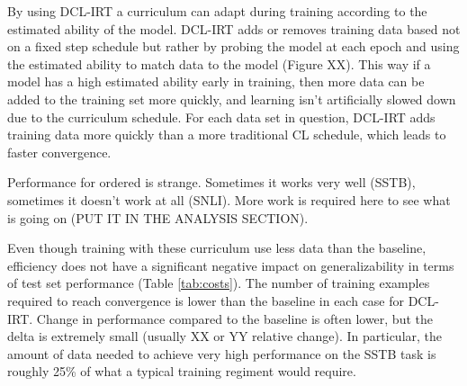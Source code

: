 \documentclass[letterpaper]{article} %
\begin{document}
By using DCL-IRT a curriculum can adapt during training according to the estimated ability of the model.
DCL-IRT adds or removes training data based not on a fixed step schedule but rather by probing the model at each epoch and using the estimated ability to match data to the model (Figure XX).
This way if a model has a high estimated ability early in training, then more data can be added to the training set more quickly, and learning isn't artificially slowed down due to the curriculum schedule.
For each data set in question, DCL-IRT adds training data more quickly than a more traditional CL schedule, which leads to faster convergence.

Performance for ordered is strange.
Sometimes it works very well (SSTB), sometimes it doesn't work at all (SNLI).
More work is required here to see what is going on (PUT IT IN THE ANALYSIS SECTION).

Even though training with these curriculum use less data than the baseline, efficiency does not have a significant negative impact on generalizability in terms of test set performance (Table \ref{tab:costs}).
The number of training examples required to reach convergence is lower than the baseline in each case for DCL-IRT.
Change in performance compared to the baseline is often lower, but the delta is extremely small (usually XX or YY relative change). 
In particular, the amount of data needed to achieve very high performance on the SSTB task is roughly 25\% of what a typical training regiment would require.
\end{document}
